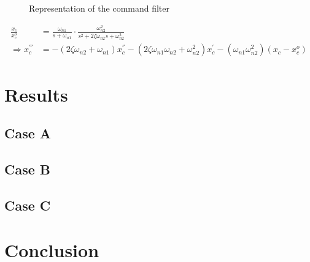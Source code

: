 \begin{figure}[h!]
	\centering
	\caption{Representation of the command filter\label{fig:CF}}
\end{figure}		

\begin{align}\label{eq:CF}
\frac{x_c}{x_c^o}&=\frac{\omega_{n1}}{s+\omega_{n1}}\cdot\frac{\omega_{n2}^2}{s^2+2\zeta\omega_{n2}s+\omega_{n2}^2}\\
\Rightarrow x_c^{'''}&=-(2\zeta\omega_{n2}+\omega_{n1})x_c^{''}-(2\zeta\omega_{n1}\omega_{n2}+\omega_{n2}^2)x_c^{'}-(\omega_{n1}\omega_{n2} ^2)(x_c-x_c^o)
\end{align}

\section{Results}
\subsection{Case A}
\subsection{Case B}
\subsection{Case C}


\section{Conclusion}


